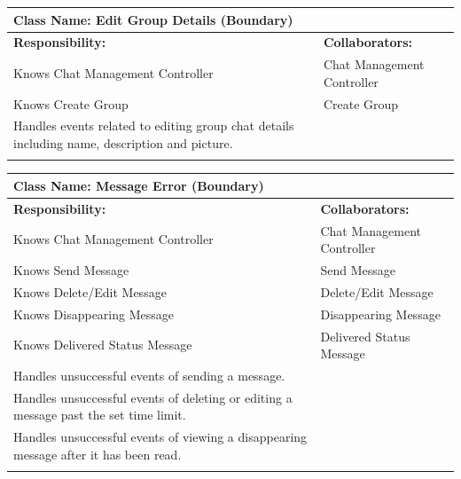 \documentclass[]{article}
\begin{document}
   	\begin{table}[ht]
		\centering
		\begin{tabular}{|p{7cm}|p{7cm}|}
		\hline 
		\multicolumn{2}{|l|}{\textbf{Class Name:} Edit Group Details (Boundary)} \\
		\hline
		\textbf{Responsibility:} & \textbf{Collaborators:} \\
		\hline
  			Knows Chat Management Controller & Chat Management Controller \\
			Knows Create Group & Create Group \\
			Handles events related to editing group chat details including name, description and picture. &\\
		\vspace{1in} & \\
		\hline
		\end{tabular}
	\end{table}

    	\begin{table}[ht]
		\centering
		\begin{tabular}{|p{7cm}|p{7cm}|}
		\hline 
		\multicolumn{2}{|l|}{\textbf{Class Name:} Message Error (Boundary)} \\
		\hline
		\textbf{Responsibility:} & \textbf{Collaborators:} \\
		\hline
  			Knows Chat Management Controller & Chat Management Controller \\
			Knows Send Message & Send Message \\
			Knows Delete/Edit Message & Delete/Edit Message \\
			Knows Disappearing Message & Disappearing Message \\
			Knows Delivered Status Message & Delivered Status Message \\
   			Handles unsuccessful events of sending a message. &\\
			Handles unsuccessful events of deleting or editing a message past the set time limit. &\\
			Handles unsuccessful events of viewing a disappearing message after it has been read. &\\
		\vspace{1in} & \\
		\hline
		\end{tabular}
	\end{table}
\end{document}
